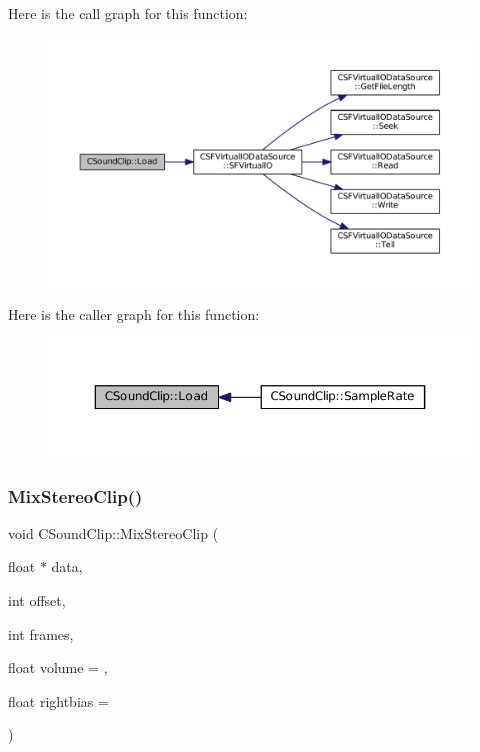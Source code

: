 Here is the call graph for this function\+:
\nopagebreak
\begin{figure}[H]
\begin{center}
\leavevmode
\includegraphics[width=350pt]{classCSoundClip_a4b8a88d0062844969cbe1ab763c3590a_cgraph}
\end{center}
\end{figure}
Here is the caller graph for this function\+:
\nopagebreak
\begin{figure}[H]
\begin{center}
\leavevmode
\includegraphics[width=350pt]{classCSoundClip_a4b8a88d0062844969cbe1ab763c3590a_icgraph}
\end{center}
\end{figure}
\hypertarget{classCSoundClip_a54fb05ee6936503af55650b10c861967}{}\label{classCSoundClip_a54fb05ee6936503af55650b10c861967} 
\subsubsection{\texorpdfstring{Mix\+Stereo\+Clip()}{MixStereoClip()}}
{\footnotesize\ttfamily void C\+Sound\+Clip\+::\+Mix\+Stereo\+Clip (\begin{DoxyParamCaption}\item[{float $\ast$}]{data,  }\item[{int}]{offset,  }\item[{int}]{frames,  }\item[{float}]{volume = {},  }\item[{float}]{rightbias = {} }\end{DoxyParamCaption})}



